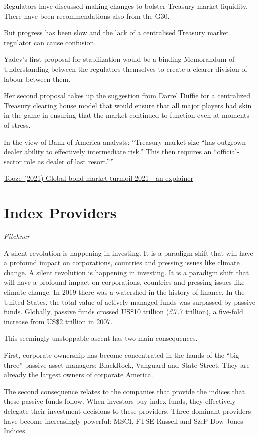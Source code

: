 \documentclass[
]{book}
\begin{document}
Regulators have discussed making changes to bolster Treasury market liquidity. There have been recommendations also from the G30.

But progress has been slow and the lack of a centralised Treasury market regulator can cause confusion.

Yadev's first proposal for stabilization would be a binding Memorandum of Understanding between the regulators themselves to create a clearer division of labour between them.

Her second proposal takes up the suggestion from Darrel Duffie for a centralized Treasury clearing house model that would ensure that all major players had skin in the game in ensuring that the market continued to function even at moments of stress.

In the view of Bank of America analysts: ``Treasury market size ``has outgrown dealer ability to effectively intermediate risk.'' This then requires an ``official-sector role as dealer of last resort.''''

\href{https://adamtooze.substack.com/p/chartbook-49-global-bond-market-turmoil}{Tooze (2021) Global bond market turmoil 2021 - an explainer}

\hypertarget{index-providers-1}{%
\chapter{Index Providers}\label{index-providers-1}}

\emph{Fitchner}

A silent revolution is happening in investing. It is a paradigm shift that will have a profound impact on corporations, countries and pressing issues like climate change.
A silent revolution is happening in investing. It is a paradigm shift that will have a profound impact on corporations, countries and pressing issues like climate change.
In 2019 there was a watershed in the history of finance. In the United States, the total value of actively managed funds was surpassed by passive funds. Globally, passive funds crossed US\$10 trillion (£7.7 trillion), a five-fold increase from US\$2 trillion in 2007.

This seemingly unstoppable ascent has two main consequences.

First, corporate ownership has become concentrated in the hands of the ``big three'' passive asset managers: BlackRock, Vanguard and State Street. They are already the largest owners of corporate America.

The second consequence relates to the companies that provide the indices that these passive funds follow. When investors buy index funds, they effectively delegate their investment decisions to these providers. Three dominant providers have become increasingly powerful: MSCI, FTSE Russell and S\&P Dow Jones Indices.
\end{document}
